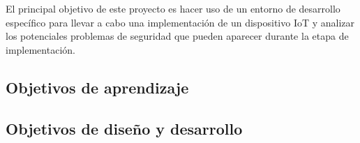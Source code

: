 El principal objetivo de este proyecto es hacer uso de un entorno de desarrollo específico para llevar a cabo una implementación de un dispositivo IoT y analizar los potenciales problemas de seguridad que pueden aparecer durante la etapa de implementación.

\subsection{Objetivos de aprendizaje}


\subsection{Objetivos de diseño y desarrollo}



